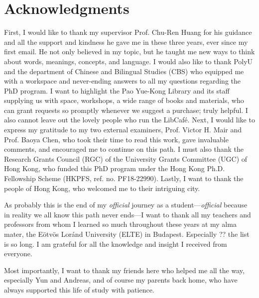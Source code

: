 \chapter*{Acknowledgments}
\label{ch:acknowledgments}


First, I would like to thank my supervisor Prof. Chu-Ren Huang for his guidance and all the support and kindness he gave me in these three years, ever since my first email. He not only believed in my topic, but he taught me new ways to think about words, meanings, concepts, and language. I would also like to thank PolyU and the department of Chinese and Bilingual Studies (CBS) who equipped me with a workspace and never-ending answers to all my questions regarding the PhD program. I want to highlight the Pao Yue-Kong Library and its staff supplying us with space, workshops, a wide range of books and materials, who can grant requests so promptly whenever we suggest a purchase; truly helpful. I also cannot leave out the lovely people who run the LibCafé. Next, I would like to express my gratitude to my two external examiners, Prof. Victor H. Mair and Prof. Baoya Chen, who took their time to read this work, gave invaluable comments, and encouraged me to continue on this path. I must also thank the Research Grants Council (RGC) of the University Grants Committee (UGC) of Hong Kong, who funded this PhD program under the Hong Kong Ph.D. Fellowship Scheme (HKPFS, ref. no. PF18-22990). Lastly, I want to thank the people of Hong Kong, who welcomed me to their intriguing city.

As probably this is the end of my \textit{official} journey as a student---\textit{official} because in reality we all know this path never ends---I want to thank all my teachers and professors from whom I learned so much throughout these years at my alma mater, the Eötvös Loránd University (ELTE) in Budapest. Especially ?? the list is so long. I am grateful for all the knowledge and insight I received from everyone.

Most importantly, I want to thank my friends here who helped me all the way, especially Yun and Andreas, and of course my parents back home, who have always supported this life of study with patience.


